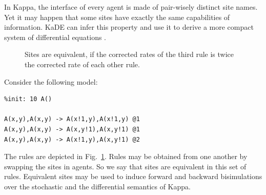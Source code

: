 \documentclass[11pt]{book}
\def\KaDE{\textsf{KaDE}}
\begin{document}
In Kappa, the interface of every agent is made of pair-wisely distinct site names. Yet it may happen that some sites have exactly the same capabilities of information. {\KaDE} can infer this property and use it to derive a more compact system of differential equations \cite{Feret-MFPSXXVII,CAMPORESI201073,Feret201545}.

\begin{figure}[t]
  \begin{minipage}{0.3\linewidth}
    \centering{}
  \end{minipage}\hspace*{5mm}
  \begin{minipage}{0.3\linewidth}
  \end{minipage}\hspace*{5mm}
\begin{minipage}{0.3\linewidth}
    \centering{}
  \end{minipage}
  \caption{Sites are equivalent, if the corrected rates of the third rule is twice the corrected rate of each other rule.}
  \label{fig:symetric:rules}
\end{figure}

Consider the following model:
\begin{lstlisting}[language=kappa]
%agent: A(x,y)
%init: 10 A()

A(x,y),A(x,y) -> A(x!1,y),A(x!1,y) @1
A(x,y),A(x,y) -> A(x,y!1),A(x,y!1) @1
A(x,y),A(x,y) -> A(x!1,y),A(x,y!1) @2
\end{lstlisting}
The rules are depicted in Fig.~\ref{fig:symetric:rules}. Rules may be obtained from one another by swapping the sites in agents.  So we say that sites are equivalent in this set of rules. Equivalent sites may be used to induce forward and backward bisimulations \cite{buchholz_bisimulation,Feret_IJSI2013,Feret-MFPSXXVII,CAMPORESI201073,Feret201545} over the stochastic and the differential semantics of Kappa.
\end{document}
